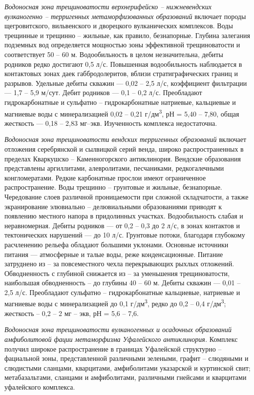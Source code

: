 \textit{Водоносная зона трещиноватости верхнерифейско -- нижневендских вулканогенно -- терригенных метаморфизованных образований} включает
породы щегровитского, вильвенского и дворецкого вулканических комплексов. Воды трещинные и трещинно -- жильные, как правило, безнапорные. Глубина залегания подземных вод определяется мощностью зоны эффективной трещиноватости и соответствует 50 -- 60 м. Водообильность в целом незначительна, дебиты родников редко достигают 0,5 л/с. Повышенная водообильность наблюдается в контактовых зонах даек габбродолеритов, вблизи стратиграфических границ и разрывов. Удельные дебиты скважин  ---  0,02 -- 2,5 л/с, коэффициент фильтрации  ---  1,7 -- 5,9 м/сут. Дебит родников  ---  0,1 -- 0,2 л/с. Преобладают гидрокарбонатные и сульфатно -- гидрокарбонатные натриевые, кальциевые и магниевые воды с минерализацией 0,02 -- 0,21 г/дм\textsuperscript{3}, рН = 5,40 -- 7,80, общая жесткость  ---  0,18 -- 2,83 мг--экв. Изученность комплекса недостаточна.

\textit{Водоносная зона трещиноватости вендских терригенных образований} включает отложения серебрянской и сылвицкой серий венда, широко распространенных в пределах Кваркушско -- Каменногорского антиклинория.
Вендские образования представлены аргиллитами, алевролитами, песчаниками, редкогалечными конгломератами. Редкие карбонатные прослои имеют
ограниченное распространение. Воды трещинно -- грунтовые и жильные, безнапорные. Чередование слоев различной проницаемости при сложной складчатости, а также экранирование элювиально -- делювиальными образованиями приводят к появлению местного напора в придолинных участках. Водообильность слабая и неравномерная. Дебиты родников  ---  от 0,2 -- 0,3 до 2 л/с, в зонах контактов и тектонических нарушений  ---  до 10 л/с. Грунтовые потоки, благодаря глубокому расчленению рельефа обладают большими уклонами.
Основные источники питания  ---  атмосферные и талые воды, реже конденсационные. Питание затруднено из -- за повсеместного чехла перекрывающих
рыхлых отложений. Обводненность с глубиной снижается из -- за уменьшения трещиноватости, наибольшая обводненность  --  до глубины 40 -- 60 м. Дебиты
скважин  ---  0,01 -- 2,5 л/с. Преобладают сульфатно -- гидрокарбонатные кальциевые, натриевые и магниевые воды с минерализацией до 0,1 г/дм\textsuperscript{3}, редко до 0,2 -- 0,4 г/дм\textsuperscript{3}; жесткость  --  0,2 -- 2 мг -- экв, рН = 5,6 -- 7,6.

\textit{Водоносная зона трещиноватости вулканогенных и осадочных образований амфиболитовой фации метаморфизма Уфалейского антиклинория.} Комплекс получил широкое распространение в границах Уфалейской структурно -- фациальной зоны, представленной различными зелеными, графит -- слюдяными и слюдистыми сланцами, кварцитами, амфиболитами указарской и куртинской свит; метабазальтами, сланцами и амфиболитами, различными гнейсами и кварцитами уфалейского комплекса.

